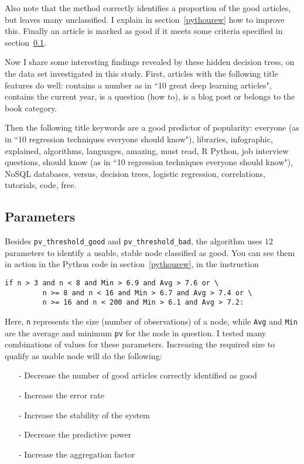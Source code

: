 \documentclass[oneside,10pt]{book}
\begin{document}
\noindent Also note that the method correctly identifies a proportion of the good articles, but leaves many unclassified. I explain in section~\ref{pythourew}
 how to improve this. Finally an article is marked as good if it meets some criteria specified  in section~\ref{parambana}.

Now I share some interesting findings revealed by these hidden decision tress, on the data set investigated in this study. First, articles with the following title features do well:
	contains a number as in ``10 great deep learning articles",
	contains the current year,
	is a question  (how to),
	is a blog post or belongs to the book category.

Then the following title keywords are a good predictor of popularity:
	everyone (as in ``10 regression techniques everyone should know"),
	libraries,
	infographic,
	explained,
	algorithms,
	languages,
	amazing,
	must read,
	R Python,
	job interview questions,
	should know (as in ``10 regression techniques everyone should know"),
	NoSQL databases,
	versus,
	decision trees,
	logistic regression,
	correlations,
	tutorials,
	code,
	free.

\subsection{Parameters}\label{parambana} %

Besides \texttt{pv\_threshold\_good} and \texttt{pv\_threshold\_bad}, the algorithm uses $12$ parameters to identify a usable, stable node classified as good. You can see them in action in the Python code
 in section~\ref{pythourew}, in the instruction

\begin{lstlisting}[frame=none]
     if n > 3 and n < 8 and Min > 6.9 and Avg > 7.6 or \
         n >= 8 and n < 16 and Min > 6.7 and Avg > 7.4 or \
         n >= 16 and n < 200 and Min > 6.1 and Avg > 7.2:
\end{lstlisting}


\noindent Here, \texttt{n} represents the size (number of observations) of a node, while \texttt{Avg} and \texttt{Min} are the average and minimum \texttt{pv} for the node in question.  I tested many combinations of values for these parameters. Increasing the required size to qualify as usable node will do the following:\vspace{1ex}
\begin{itemize}
	\item[-] Decrease the number of good articles correctly identified as good
	\item[-] Increase the error rate
	\item[-] Increase the stability of the system
	\item[-] Decrease the predictive power
	\item[-] Increase the aggregation factor
\end{itemize}\vspace{1ex}
\end{document}
